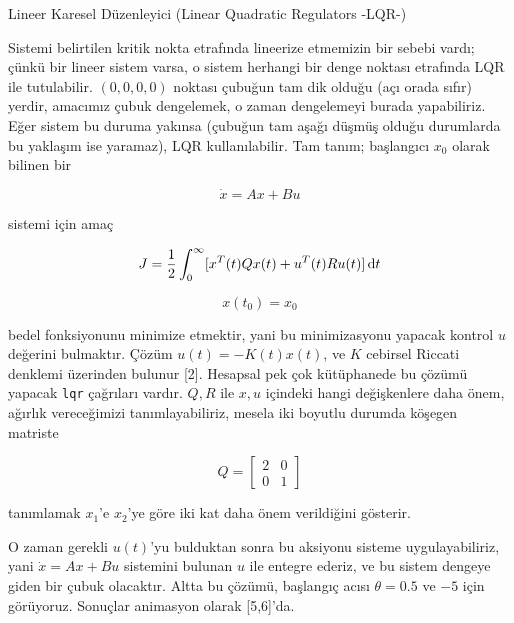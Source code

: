 \documentclass[12pt,fleqn]{article}\usepackage{../../common}
\begin{document}
Lineer Karesel Düzenleyici (Linear Quadratic Regulators -LQR-)

Sistemi belirtilen kritik nokta etrafında lineerize etmemizin bir sebebi
vardı; çünkü bir lineer sistem varsa, o sistem herhangi bir denge noktası
etrafında LQR ile tutulabilir. $(0,0,0,0)$ noktası çubuğun tam dik olduğu
(açı orada sıfır) yerdir, amacımız çubuk dengelemek, o zaman dengelemeyi
burada yapabiliriz. Eğer sistem bu duruma yakınsa (çubuğun tam aşağı düşmüş
olduğu durumlarda bu yaklaşım ise yaramaz), LQR kullanılabilir. Tam tanım;
başlangıcı $x_0$ olarak bilinen bir

$$
\dot{x} = A x + B u
$$

sistemi için amaç

$$
J = \frac{1}{2} \int _{0}^{\infty} [ x^T(t) Q x(t) + u^T(t) R u(t) ] \,\mathrm{d} t
$$

$$
x(t_0) = x_0
$$

bedel fonksiyonunu minimize etmektir, yani bu minimizasyonu yapacak kontrol
$u$ değerini bulmaktır. Çözüm $u(t) = -K(t) x (t)$, ve $K$ cebirsel
Riccati denklemi üzerinden bulunur [2]. Hesapsal pek çok kütüphanede bu
çözümü yapacak \verb!lqr! çağrıları vardır. $Q,R$ ile $x,u$ içindeki hangi
değişkenlere daha önem, ağırlık vereceğimizi tanımlayabiliriz, mesela iki
boyutlu durumda köşegen matriste 

$$
Q = \left[\begin{array}{rrr}
2 & 0 \\ 0 & 1
\end{array}\right]
$$

tanımlamak $x_1$'e $x_2$'ye göre iki kat daha önem verildiğini gösterir. 

O zaman gerekli $u(t)$'yu bulduktan sonra bu aksiyonu sisteme
uygulayabiliriz, yani $\dot{x} = A x + B u$ sistemini bulunan $u$ ile
entegre ederiz, ve bu sistem dengeye giden bir çubuk olacaktır. Altta bu
çözümü, başlangıç acısı $\theta = 0.5$ ve $-5$ için görüyoruz. Sonuçlar
animasyon olarak [5,6]'da.
\end{document}
